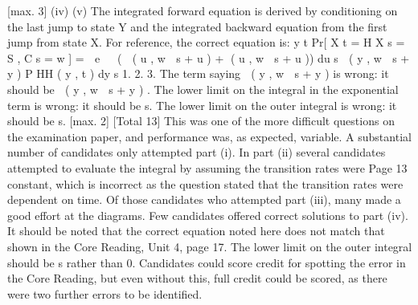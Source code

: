 \documentclass[a4paper,12pt]{article}
\begin{document}
[max. 3]
(iv)
(v)
The integrated forward equation is derived by conditioning
on the last jump to state Y and the integrated backward
equation from the first jump from state X.
For reference, the correct equation is:
y
t
Pr[ X t \;=\; H X s \;=\; S , C s \;=\; w ] \;=\;  e
  (  ( u , w  s \;+\; u ) \;+\; ( u , w  s \;+\; u )) du
s
 ( y , w  s \;+\; y ) P HH ( y , t ) dy
s
1.
2.
3.
The term saying  ( y , w  s \;+\; y ) is wrong: 
it should be  ( y , w  s \;+\; y ) . 
The lower limit on the integral in the exponential term is wrong: 
it should be s. 
The lower limit on the outer integral is wrong: 
it should be s. 
[max. 2]
[Total 13]
This was one of the more difficult questions on the examination paper, and performance was, as expected, variable. A substantial number of
candidates only attempted part (i). In part (ii) several candidates attempted to evaluate the integral by assuming the transition rates were
Page 13%
constant, which is incorrect as the question stated that the transition rates were dependent on time. Of those candidates who attempted part
(iii), many made a good effort at the diagrams. Few candidates offered correct solutions to part (iv). It should be noted that the correct
equation noted here does not match that shown in the Core Reading, Unit 4, page 17. The lower limit on the outer integral should be s
rather than 0. Candidates could score credit for spotting the error in the Core Reading, but even without this, full credit could be scored, as
there were two further errors to be identified.
\end{document}
